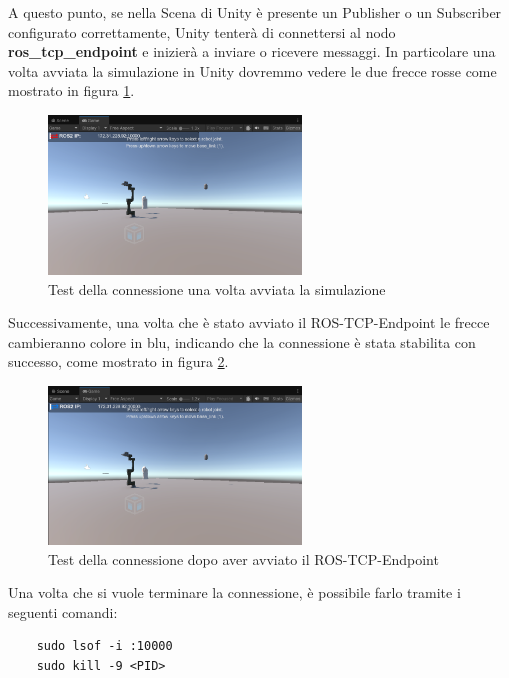 \documentclass[11pt]{report}
\begin{document}
A questo punto, se nella Scena di Unity è presente un Publisher o un Subscriber configurato correttamente, Unity tenterà di connettersi al nodo \textbf{ros\_tcp\_endpoint} e inizierà a inviare o ricevere messaggi.
In particolare una volta avviata la simulazione in Unity dovremmo vedere le due frecce rosse come mostrato in figura \ref{fig:test_connessione_1}.

\begin{figure}[H]
    \centering
    \includegraphics[width=0.6\textwidth]{images/test_connessione_1.PNG}
    \caption{Test della connessione una volta avviata la simulazione}
    \label{fig:test_connessione_1}
\end{figure}

Successivamente, una volta che è stato avviato il ROS-TCP-Endpoint le frecce cambieranno colore in blu, indicando che la connessione è stata stabilita con successo, come mostrato in figura \ref{fig:test_connessione_2}.

\begin{figure}[H]
    \centering
    \includegraphics[width=0.6\textwidth]{images/test_connessione_2.PNG}
    \caption{Test della connessione dopo aver avviato il ROS-TCP-Endpoint}
    \label{fig:test_connessione_2}
\end{figure}

Una volta che si vuole terminare la connessione, è possibile farlo tramite i seguenti comandi:
\begin{verbatim}
    sudo lsof -i :10000
    sudo kill -9 <PID>
\end{verbatim}
\end{document}
